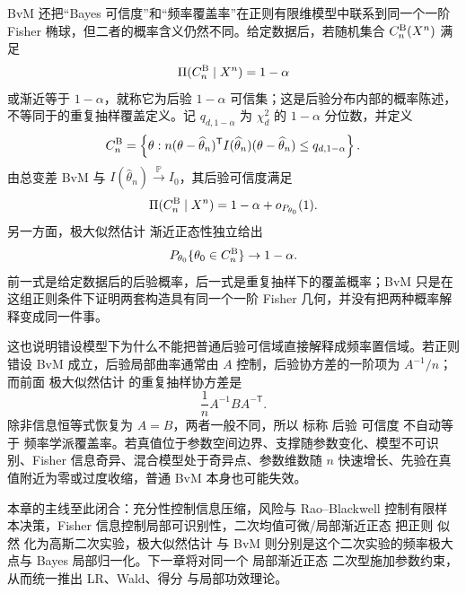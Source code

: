 \begin{corollary}
BvM 还把“Bayes 可信度”和“频率覆盖率”在正则有限维模型中联系到同一个一阶 Fisher 椭球，但二者的概率含义仍然不同。给定数据后，若随机集合 $C_n^{\rm B}(X^n)$ 满足
\[
 \Pi(C_n^{\rm B}\mid X^n)=1-\alpha
\]
或渐近等于 $1-\alpha$，就称它为后验 $1-\alpha$ 可信集；这是后验分布内部的概率陈述，不等同于的重复抽样覆盖定义。记 $q_{d,1-\alpha}$ 为 $\chi^2_d$ 的 $1-\alpha$ 分位数，并定义
\begin{equation*}C_n^{\rm B}
 =\left\{
 \theta:
 n(\theta-\widehat\theta_n)^{\mathsf T}
 I(\widehat\theta_n)
 (\theta-\widehat\theta_n)
 \le q_{d,1-\alpha}
 \right\}.
\end{equation*}
由总变差 BvM 与 $I(\widehat\theta_n)\xrightarrow{\mathbb P} I_0$，其后验可信度满足
\[
 \Pi(C_n^{\rm B}\mid X^n)=1-\alpha+o_{P_{\theta_0}}(1).
\]
另一方面，极大似然估计 渐近正态性独立给出
\[
 P_{\theta_0}\{\theta_0\in C_n^{\rm B}\}
 \to1-\alpha.
\]
前一式是给定数据后的后验概率，后一式是重复抽样下的覆盖概率；BvM 只是在这组正则条件下证明两套构造具有同一个一阶 Fisher 几何，并没有把两种概率解释变成同一件事。
\end{corollary}

\begin{note}[错设或奇异情形不能混用概率解释]
这也说明错设模型下为什么不能把普通后验可信域直接解释成频率置信域。若正则错设 BvM 成立，后验局部曲率通常由 $A$ 控制，后验协方差的一阶项为 $A^{-1}/n$；而前面 极大似然估计 的重复抽样协方差是
\[
 \frac1nA^{-1}BA^{-\mathsf T}.
\]
除非信息恒等式恢复为 $A=B$，两者一般不同，所以 标称 后验 可信度 不自动等于 频率学派覆盖率。若真值位于参数空间边界、支撑随参数变化、模型不可识别、Fisher 信息奇异、混合模型处于奇异点、参数维数随 $n$ 快速增长、先验在真值附近为零或过度收缩，普通 BvM 本身也可能失效。
\end{note}

本章的主线至此闭合：充分性控制信息压缩，风险与 Rao--Blackwell 控制有限样本决策，Fisher 信息控制局部可识别性，二次均值可微/局部渐近正态 把正则 似然 化为高斯二次实验，极大似然估计 与 BvM 则分别是这个二次实验的频率极大点与 Bayes 局部归一化。下一章将对同一个 局部渐近正态 二次型施加参数约束，从而统一推出 LR、Wald、得分 与局部功效理论。










